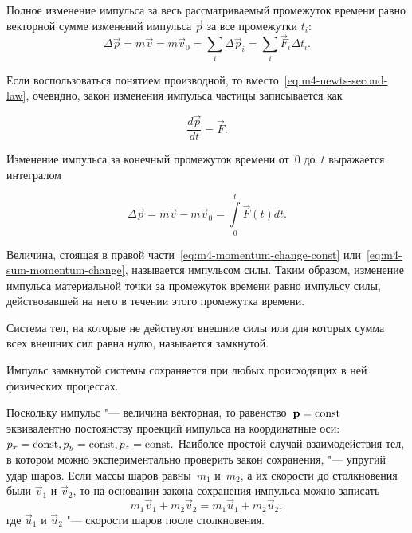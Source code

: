 \documentclass[a4paper, 12pt]{extarticle}
\newcommand{\issum}{\sum\limits_{i}}
\begin{document}
Полное изменение импульса за весь рассматриваемый промежуток времени равно векторной сумме изменений импульса $\vec p$ за все промежутки $t_i$:
\begin{equation}
\label{eq:m4-sum-momentum-change}
\Delta \vec p = m \vec v = m \vec v_0 = \issum \Delta \vec p_i = \issum \vec F_i \Delta t_i.
\end{equation}

Если воспользоваться понятием производной, то вместо~\eqref{eq:m4-newts-second-law}, очевидно, закон изменения импульса частицы записывается как

\begin{equation}
\label{eq:m4-momentum-change-via-drvt}
\frac{d \vec p}{d t} = \vec F .
\end{equation}

Изменение импульса за конечный промежуток времени от~0 до~$t$ выражается интегралом

\begin{equation}
\label{eq:m4-total-momentum-change-via-int}
\Delta \vec p = m \vec v - m \vec v_0 = \int\limits_0^t \vec F\left(t\right) d t.
\end{equation}

Величина, стоящая в правой части~\eqref{eq:m4-momentum-change-const} или~\eqref{eq:m4-sum-momentum-change}, называется импульсом силы. Таким образом, изменение импульса материальной точки за промежуток времени равно импульсу силы, действовавшей на него в течении этого промежутка времени.

Система тел, на которые не действуют внешние силы или для которых сумма всех внешних сил равна нулю, называется замкнутой.

Импульс замкнутой системы сохраняется при любых происходящих в ней физических процессах.

Поскольку импульс "--- величина векторная, то равенство~$\mathbf{p} = \textrm{const}$ эквивалентно постоянству проекций импульса на координатные оси: $p_x = \textrm{const}, p_y = \textrm{const}, p_z = \textrm{const}.$  
Наиболее простой случай взаимодействия тел, в котором можно экспериментально проверить закон сохранения, "--- упругий удар шаров. Если массы шаров равны~$m_1$ и~$m_2$, а их скорости до столкновения были $\vec v_1$ и $\vec v_2$, то на основании закона сохранения импульса можно записать
\begin{equation}
\label{eq:m4-balls-collision}
m_1 \vec v_1 + m_2 \vec v_2 = m_1 \vec u_1 + m_2 \vec u_2,
\end{equation}
где $\vec u_1$ и $\vec u_2$ "--- скорости шаров после столкновения.
\end{document}
